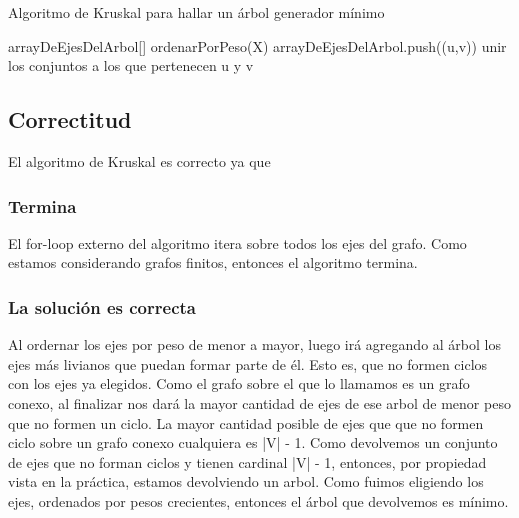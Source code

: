 \documentclass[a4paper]{report}
\begin{document}
\begin{algorithm} \caption{Algoritmo de Kruskal para hallar un árbol generador mínimo}

    \begin{algorithmic}[1]
    
         
            \State arrayDeEjesDelArbol[]
            \State ordenarPorPeso(X) 
             
                 
                    \State arrayDeEjesDelArbol.push((u,v))
                    \State unir los conjuntos a los que pertenecen u y v   
                \EndIf
            \EndFor
        
        \EndFunction
    
    \end{algorithmic}

\end{algorithm}


\subsection{Correctitud}
    El algoritmo de Kruskal es correcto ya que
    \subsubsection{Termina}
    El for-loop externo del algoritmo itera sobre todos los ejes del grafo. Como estamos considerando grafos finitos, entonces el algoritmo termina.
    \subsubsection{La solución es correcta}
    Al ordernar los ejes por peso de menor a mayor, luego irá agregando al árbol los ejes más livianos que puedan formar parte de él. Esto es, que no formen ciclos con los ejes ya elegidos. Como el grafo sobre el que lo llamamos es un grafo conexo, al finalizar nos dará la mayor cantidad de ejes de ese arbol de menor peso que no formen un ciclo. La mayor cantidad posible de ejes que que no formen ciclo sobre un grafo conexo cualquiera es |V| - 1. Como devolvemos un conjunto de ejes que no forman ciclos y tienen cardinal |V| - 1, entonces, por propiedad vista en la práctica, estamos devolviendo un arbol. 
    Como fuimos eligiendo los ejes, ordenados por pesos crecientes, entonces el árbol que devolvemos es mínimo.
\end{document}
